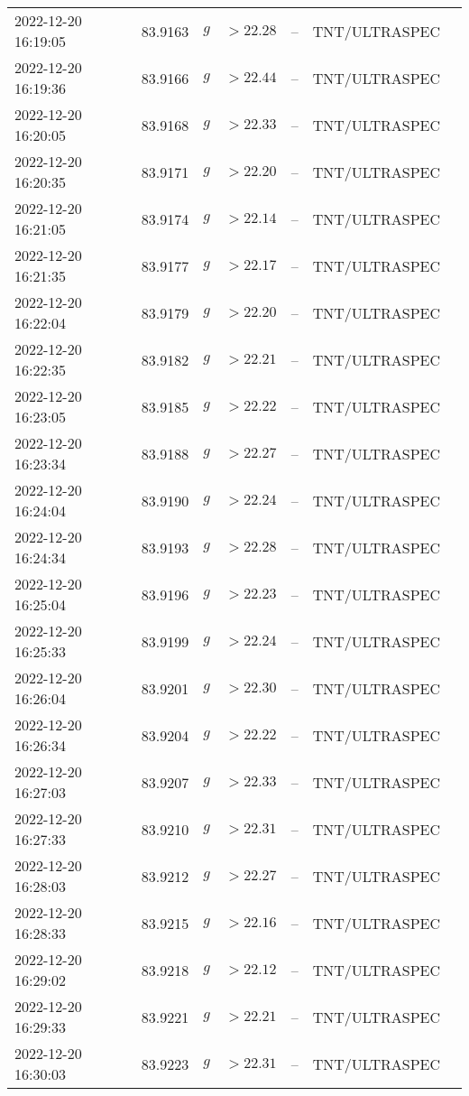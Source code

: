 \documentclass{nature_plusfigure}
\begin{document}
\begin{supplement}
\begin{center}
\begin{longtable}{lllllll}
2022-12-20 16:19:05 & 83.9163 & $g$ & $>22.28$ & -- & TNT/ULTRASPEC &  \\ 
2022-12-20 16:19:36 & 83.9166 & $g$ & $>22.44$ & -- & TNT/ULTRASPEC &  \\ 
2022-12-20 16:20:05 & 83.9168 & $g$ & $>22.33$ & -- & TNT/ULTRASPEC &  \\ 
2022-12-20 16:20:35 & 83.9171 & $g$ & $>22.20$ & -- & TNT/ULTRASPEC &  \\ 
2022-12-20 16:21:05 & 83.9174 & $g$ & $>22.14$ & -- & TNT/ULTRASPEC &  \\ 
2022-12-20 16:21:35 & 83.9177 & $g$ & $>22.17$ & -- & TNT/ULTRASPEC &  \\ 
2022-12-20 16:22:04 & 83.9179 & $g$ & $>22.20$ & -- & TNT/ULTRASPEC &  \\ 
2022-12-20 16:22:35 & 83.9182 & $g$ & $>22.21$ & -- & TNT/ULTRASPEC &  \\ 
2022-12-20 16:23:05 & 83.9185 & $g$ & $>22.22$ & -- & TNT/ULTRASPEC &  \\ 
2022-12-20 16:23:34 & 83.9188 & $g$ & $>22.27$ & -- & TNT/ULTRASPEC &  \\ 
2022-12-20 16:24:04 & 83.9190 & $g$ & $>22.24$ & -- & TNT/ULTRASPEC &  \\ 
2022-12-20 16:24:34 & 83.9193 & $g$ & $>22.28$ & -- & TNT/ULTRASPEC &  \\ 
2022-12-20 16:25:04 & 83.9196 & $g$ & $>22.23$ & -- & TNT/ULTRASPEC &  \\ 
2022-12-20 16:25:33 & 83.9199 & $g$ & $>22.24$ & -- & TNT/ULTRASPEC &  \\ 
2022-12-20 16:26:04 & 83.9201 & $g$ & $>22.30$ & -- & TNT/ULTRASPEC &  \\ 
2022-12-20 16:26:34 & 83.9204 & $g$ & $>22.22$ & -- & TNT/ULTRASPEC &  \\ 
2022-12-20 16:27:03 & 83.9207 & $g$ & $>22.33$ & -- & TNT/ULTRASPEC &  \\ 
2022-12-20 16:27:33 & 83.9210 & $g$ & $>22.31$ & -- & TNT/ULTRASPEC &  \\ 
2022-12-20 16:28:03 & 83.9212 & $g$ & $>22.27$ & -- & TNT/ULTRASPEC &  \\ 
2022-12-20 16:28:33 & 83.9215 & $g$ & $>22.16$ & -- & TNT/ULTRASPEC &  \\ 
2022-12-20 16:29:02 & 83.9218 & $g$ & $>22.12$ & -- & TNT/ULTRASPEC &  \\ 
2022-12-20 16:29:33 & 83.9221 & $g$ & $>22.21$ & -- & TNT/ULTRASPEC &  \\ 
2022-12-20 16:30:03 & 83.9223 & $g$ & $>22.31$ & -- & TNT/ULTRASPEC &  \\ 

\end{longtable}
\end{center}
\end{supplement}
\end{document}
